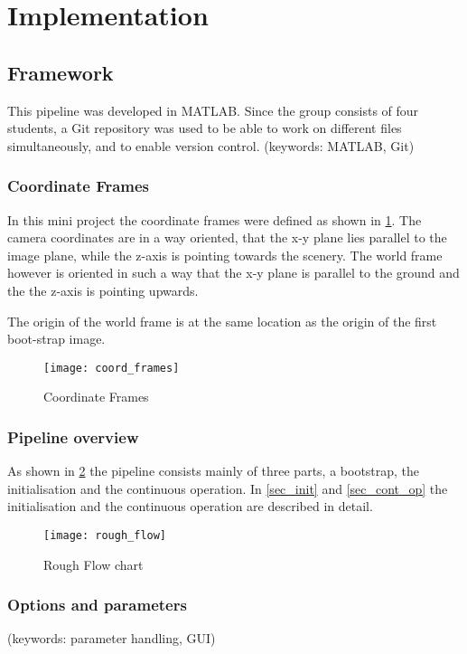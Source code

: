 \section{Implementation}

\subsection{Framework}
This pipeline was developed in MATLAB. Since the group consists of four students, a Git repository was used to be able to work on different files simultaneously, and to enable version control.
(keywords: MATLAB, Git)

\subsubsection{Coordinate Frames}
In this mini project the coordinate frames were defined as shown in \cref{img_coord_frames}. The camera coordinates are in a way oriented, that the x-y plane lies parallel to the image plane, while the z-axis is pointing towards the scenery. The world frame however is oriented in such a way that the x-y plane is parallel to the ground and the the z-axis is pointing upwards.

The origin of the world frame is at the same location as the origin of the first boot-strap image.

\begin{figure}[ht]
	\centering
	\texttt{[image: coord\_frames]}
	\caption{Coordinate Frames}
	\label{img_coord_frames}
\end{figure}

\subsubsection{Pipeline overview}

As shown in \cref{img_flow_rough} the pipeline consists mainly of three parts, a bootstrap, the initialisation and the continuous operation. In \cref{sec_init} and \cref{sec_cont_op} the initialisation and the continuous operation are described in detail.

\begin{figure}[ht]
	\centering
	\texttt{[image: rough\_flow]}
	\caption{Rough Flow chart}
	\label{img_flow_rough}
\end{figure}
%
\subsubsection{Options and parameters}
(keywords: parameter handling, GUI)



\clearpage{\pagestyle{plain}\cleardoublepage}

\clearpage{\pagestyle{plain}\cleardoublepage}